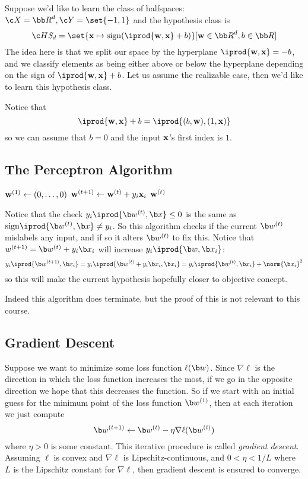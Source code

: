 Suppose we'd like to learn the class of halfspaces: $\c X={\bb R}^d,\c Y=\set{-1,1}$ and the hypothesis class is
$$ \c H{\it S}_d = \set{{\bf x}\mapsto{\rm sign}(\iprod{{\bf w},{\bf x}}+b)}[{\bf w}\in{\bb R}^d, b\in{\bb R}] $$
The idea here is that we split our space by the hyperplane $\iprod{{\bf w},{\bf x}}=-b$, and we classify elements as being either above or below the hyperplane depending on the sign of
$\iprod{{\bf w},{\bf x}}+b$.
Let us assume the realizable case, then we'd like to learn this hypothesis class.

Notice that
$$ \iprod{{\bf w},{\bf x}} + b = \iprod{(b,{\bf w}),(1,{\bf x})} $$
so we can assume that $b=0$ and the input ${\bf x}$'s first index is $1$.

\subsection{The Perceptron Algorithm}

\algorithm
        \State ${\bf w}^{(1)}\gets(0,\dots,0)$
                \State ${\bf w}^{(t+1)} \gets {\bf w}^{(t)} + y_i{\bf x}_i$
            \Else
                \State\Return ${\bf w}^{(t)}$
            \EndIf
        \EndFor
    \EndFunc
\ealgorithm

Notice that the check $y_i\iprod{\b w^{(t)},\b x}\leq0$ is the same as ${\rm sign}\iprod{\b w^{(t)},\b x}\neq y_i$.
So this algorithm checks if the current $\b w^{(t)}$ mislabels any input, and if so it alters $\b w^{(t)}$ to fix this.
Notice that $w^{(t+1)}=\b w^{(t)}+y_i\b x_i$ will increase $y_i\iprod{\b w,\b x_i}$:
$$ y_i\iprod{\b w^{(t+1)},\b x_i} = y_i\iprod{\b w^{(t)}+y_i\b x_i,\b x_i} = y_i\iprod{\b w^{(t)},\b x_i} + \norm{\b x_i}^2 $$
so this will make the current hypothesis hopefully closer to objective concept.

Indeed this algorithm does terminate, but the proof of this is not relevant to this course.

\subsection{Gradient Descent}

Suppose we want to minimize some loss function $\ell(\b w)$.
Since $\nabla\ell$ is the direction in which the loss function increases the most, if we go in the opposite direction we hope that this decreases the function.
So if we start with an initial guess for the minimum point of the loss function $\b w^{(1)}$, then at each iteration we just compute
$$ \b w^{(t+1)} \gets \b w^{(t)} - \eta\nabla\ell(\b w^{(t)}) $$
where $\eta>0$ is some constant.
This iterative procedure is called {\it gradient descent}.
Assuming $\ell$ is convex and $\nabla\ell$ is Lipschitz-continuous, and $0<\eta<1/L$ where $L$ is the Lipschitz constant for $\nabla\ell$, then gradient descent is ensured to converge.

